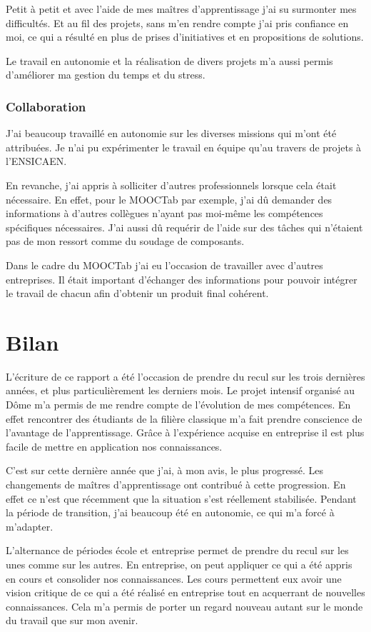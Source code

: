 \documentclass[french,12pt,a4paper,titlepage,openright,openbib]{report}
\begin{document}
Petit à petit et avec l'aide de mes maîtres d'apprentissage j'ai su surmonter mes difficultés.
Et au fil des projets, sans m'en rendre compte j'ai pris confiance en moi, ce qui a résulté en plus de prises d'initiatives et en propositions de solutions.

Le travail en autonomie et la réalisation de divers projets m'a aussi permis d'améliorer ma gestion du temps et du stress.

\subsection{Collaboration}
J'ai beaucoup travaillé en autonomie sur les diverses missions qui m'ont été attribuées. Je n'ai pu expérimenter le travail en équipe qu'au travers de projets à l'ENSICAEN.

En revanche, j'ai appris à solliciter d'autres professionnels lorsque cela était nécessaire.
En effet, pour le MOOCTab par exemple, j'ai dû demander des informations à d'autres collègues n'ayant pas moi-même les compétences spécifiques nécessaires.
J'ai aussi dû requérir de l'aide sur des tâches qui n'étaient pas de mon ressort comme du soudage de composants.

Dans le cadre du MOOCTab j'ai eu l'occasion de travailler avec d'autres entreprises. Il était important d'échanger des informations pour pouvoir intégrer le travail de chacun afin d'obtenir un produit final cohérent.

\chapter{Bilan}
L'écriture de ce rapport a été l'occasion de prendre du recul sur les trois dernières années, et plus particulièrement les derniers mois.
Le projet intensif organisé au Dôme m'a permis de me rendre compte de l'évolution de mes compétences.
En effet rencontrer des étudiants de la filière classique m'a fait prendre conscience de l'avantage de l'apprentissage. Grâce à l'expérience acquise en entreprise il est plus facile de mettre en application nos connaissances.

C'est sur cette dernière année que j'ai, à mon avis, le plus progressé.
Les changements de maîtres d'apprentissage ont contribué à cette progression. En effet ce n'est que récemment que la situation s'est réellement stabilisée. Pendant la période de transition, j'ai beaucoup été en autonomie, ce qui m'a forcé à m'adapter.

L'alternance de périodes école et entreprise permet de prendre du recul sur les unes comme sur les autres. En entreprise, on peut appliquer ce qui a été appris en cours et consolider nos connaissances. Les cours permettent eux avoir une vision critique de ce qui a été réalisé en entreprise tout en acquerrant de nouvelles connaissances. Cela m'a permis de porter un regard nouveau autant sur le monde du travail que sur mon avenir.
\end{document}
